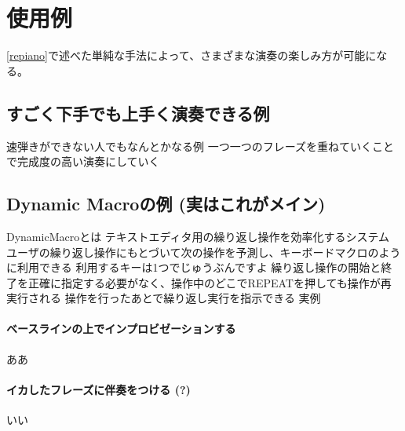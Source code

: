 \section{{\system}使用例}

\ref{repiano}で述べた単純な手法によって、さまざまな演奏の楽しみ方が可能になる。

\subsection{すごく下手でも上手く演奏できる例}
速弾きができない人でもなんとかなる例
一つ一つのフレーズを重ねていくことで完成度の高い演奏にしていく


\subsection{Dynamic Macroの例 (実はこれがメイン)}
DynamicMacro\cite{Masui}とは
テキストエディタ用の繰り返し操作を効率化するシステム
ユーザの繰り返し操作にもとづいて次の操作を予測し、キーボードマクロのように利用できる
利用するキーは1つでじゅうぶんですよ
繰り返し操作の開始と終了を正確に指定する必要がなく、操作中のどこでREPEATを押しても操作が再実行される
操作を行ったあとで繰り返し実行を指示できる
実例
\paragraph*{ベースラインの上でインプロビゼーションする}
ああ
\paragraph*{イカしたフレーズに伴奏をつける (?)}
いい
